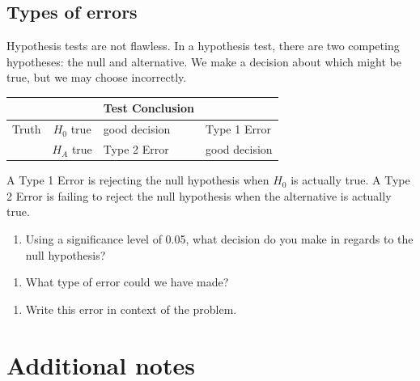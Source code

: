 \documentclass[
]{report}
\providecommand{\tightlist}{%
  \setlength{\itemsep}{0pt}\setlength{\parskip}{0pt}}
\begin{document}
\vspace{.5in}

\hypertarget{types-of-errors}{%
\subsection{Types of errors}\label{types-of-errors}}

Hypothesis tests are not flawless. In a hypothesis test, there are two competing hypotheses: the null and alternative. We make a decision about which might be true, but we may choose incorrectly.

\begin{longtable}[]{@{}ccll@{}}
\toprule
& & Test Conclusion &\tabularnewline
\midrule
\endhead
Truth & \(H_0\) true & good decision & Type 1 Error\tabularnewline
& \(H_A\) true & Type 2 Error & good decision\tabularnewline
\bottomrule
\end{longtable}

A Type 1 Error is rejecting the null hypothesis when \(H_0\) is actually true. A Type 2 Error is failing to reject the null hypothesis when the alternative is actually true.

\begin{enumerate}
\def\labelenumi{\arabic{enumi}.}
\setcounter{enumi}{25}
\tightlist
\item
  Using a significance level of 0.05, what decision do you make in regards to the null hypothesis?
\end{enumerate}

\vspace{0.5in}

\begin{enumerate}
\def\labelenumi{\arabic{enumi}.}
\setcounter{enumi}{26}
\tightlist
\item
  What type of error could we have made?
\end{enumerate}

\vspace{0.5in}

\begin{enumerate}
\def\labelenumi{\arabic{enumi}.}
\setcounter{enumi}{27}
\tightlist
\item
  Write this error in context of the problem.
\end{enumerate}

\vspace{1in}

\hypertarget{additional-notes}{%
\section{Additional notes}\label{additional-notes}}
\end{document}
